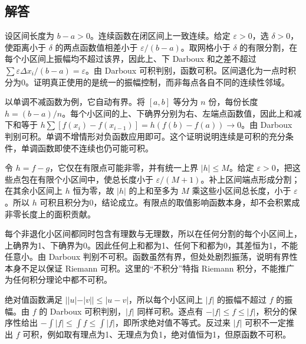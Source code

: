 \documentclass[UTF8,12pt,a4paper,fontset=fandol]{ctexart}
\begin{document}
\subsection{解答}
\begin{solve}\label{ans:c30q1}
设区间长度为 $b-a>0$。连续函数在闭区间上一致连续。给定 $\varepsilon>0$，选 $\delta>0$，使距离小于 $\delta$ 的两点函数值相差小于 $\varepsilon/(b-a)$。取网格小于 $\delta$ 的有限分割，在每个小区间上振幅均不超过该界，因此上、下 Darboux 和之差不超过 $\sum\varepsilon\Delta x_i/(b-a)=\varepsilon$。由 Darboux 可积判别，函数可积。区间退化为一点时积分为0。证明真正使用的是统一的振幅控制，而非每点各自不同的连续性邻域。
\end{solve}

\begin{solve}\label{ans:c30q2}
以单调不减函数为例，它自动有界。将 $[a,b]$ 等分为 $n$ 份，每份长度 $h=(b-a)/n$。每个小区间的上、下确界分别为右、左端点函数值，因此上和减下和等于 $h\sum[f(x_i)-f(x_{i-1})]=h(f(b)-f(a))\to0$。由 Darboux 判别可积。单调不增情形对负函数应用即可。这个证明说明连续是可积的充分条件，单调函数即使不连续也仍可能可积。
\end{solve}

\begin{solve}\label{ans:c30q3}
令 $h=f-g$，它仅在有限点可能非零，并有统一上界 $|h|\le M$。给定 $\varepsilon>0$，把这些点包在有限个小区间中，使总长度小于 $\varepsilon/(M+1)$。补上区间端点形成分割；在其余小区间上 $h$ 恒为零，故 $|h|$ 的上和至多为 $M$ 乘这些小区间总长度，小于 $\varepsilon$。所以 $h$ 可积且积分为0，结论成立。有限点的取值影响函数本身，却不会积累成非零长度上的面积贡献。
\end{solve}

\begin{solve}\label{ans:c30q4}
每个非退化小区间都同时包含有理数与无理数，所以在任何分割的每个小区间上，上确界为1、下确界为0。因此任何上和都为1、任何下和都为0，其差恒为1，不能任意小。由 Darboux 判别不可积。函数虽然有界，但处处剧烈振荡，说明有界性本身不足以保证 Riemann 可积。这里的“不积分”特指 Riemann 积分，不能推广为任何积分理论中都不可积。
\end{solve}

\begin{solve}\label{ans:c30q5}
绝对值函数满足 $||u|-|v||\le|u-v|$，所以每个小区间上 $|f|$ 的振幅不超过 $f$ 的振幅。由 $f$ 的 Darboux 可积判别，$|f|$ 同样可积。逐点有 $-|f|\le f\le|f|$，积分的保序性给出 $-\int|f|\le\int f\le\int|f|$，即所求绝对值不等式。反过来 $|f|$ 可积不一定推出 $f$ 可积，例如取有理点为1、无理点为负1，绝对值恒为1，但原函数不可积。
\end{solve}
\end{document}
